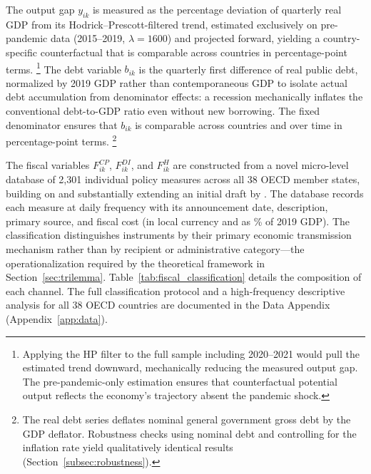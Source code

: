\documentclass[12pt, a4paper]{article}
\begin{document}

\noindent The output gap $y_{ik}$ is measured as the percentage deviation of
quarterly real GDP from its Hodrick--Prescott-filtered trend, estimated
exclusively on pre-pandemic data (2015--2019, $\lambda = 1600$) and projected
forward, yielding a country-specific counterfactual that is comparable across
countries in percentage-point terms.%
\footnote{Applying the HP filter to the full sample including 2020--2021 would
pull the estimated trend downward, mechanically reducing the measured output gap.
The pre-pandemic-only estimation ensures that counterfactual potential output
reflects the economy's trajectory absent the pandemic shock.}
The debt variable $b_{ik}$ is the quarterly first difference of real public debt,
normalized by 2019 GDP rather than contemporaneous GDP to isolate actual debt
accumulation from denominator effects: a recession mechanically inflates the
conventional debt-to-GDP ratio even without new borrowing. The fixed denominator
ensures that $b_{ik}$ is comparable across countries and over time in
percentage-point terms.%
\footnote{The real debt series deflates nominal general government gross debt by
the GDP deflator. Robustness checks using nominal debt and controlling for the
inflation rate yield qualitatively identical results
(Section~\ref{subsec:robustness}).}

The fiscal variables $F_{ik}^{CP}$, $F_{ik}^{DI}$, and $F_{ik}^{H}$ are
constructed from a novel micro-level database of 2,301 individual policy measures
across all 38 OECD member states, building on and substantially extending an
initial draft by \citet{lacey2021}. The database records each measure at daily
frequency with its announcement date, description, primary source, and fiscal
cost (in local currency and as \% of 2019 GDP). The classification distinguishes instruments by their primary economic transmission mechanism rather than by recipient or administrative category---the operationalization required by the theoretical framework in Section~\ref{sec:trilemma}. Table~\ref{tab:fiscal_classification} details the composition of each channel. The full classification protocol and a
high-frequency descriptive analysis for all 38 OECD countries are documented in
the Data Appendix (Appendix~\ref{app:data}).
\end{document}
